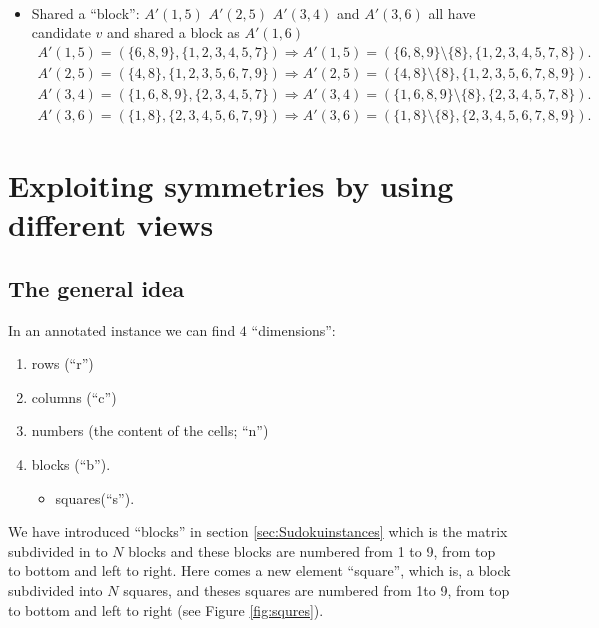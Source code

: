\documentclass[11pt]{report}
\newcommand{\set}[1]{\{ #1 \}}
\begin{document}
\begin{itemize}
\begin{eqnarray*}
\end{eqnarray*}
\item Shared a ``block'': $A'(1,5)$ $A'(2,5)$ $A'(3,4)$ and $A'(3,6)$ all have candidate $v$ and shared a block as $A'(1,6)$
\begin{eqnarray*}
A'(1,5) =(\set{6 ,8, 9}, \set{1, 2, 3, 4, 5, 7})\Rightarrow A'(1,5) =(\set{6 ,8, 9}\setminus \set{8}, \set{1, 2, 3, 4, 5, 7, 8}).\\
A'(2,5) =(\set{4, 8}, \set{1, 2, 3, 5, 6, 7, 9})\Rightarrow A'(2,5) =(\set{4, 8}\setminus \set{8}, \set{1, 2, 3, 5, 6, 7, 8, 9}).\\
A'(3,4) =(\set{1, 6, 8, 9}, \set{2, 3, 4, 5, 7})\Rightarrow A'(3,4) =(\set{1, 6, 8, 9}\setminus \set{8}, \set{2, 3, 4, 5, 7, 8}).\\
A'(3,6) =(\set{1, 8}, \set{2, 3, 4, 5, 6, 7, 9})\Rightarrow A'(3,6) =(\set{1, 8}\setminus \set{8}, \set{2, 3, 4, 5, 6, 7, 8, 9}).
\end{eqnarray*}
\end{itemize}


\chapter{Exploiting symmetries by using different views}
\label{cha:exploitingsymm}


\section{The general idea}
\label{sec:diffviewsidea}

In an annotated instance we can find $4$ ``dimensions'':
\begin{enumerate}
\item rows (``r'')
\item columns (``c'')
\item numbers (the content of the cells; ``n'')
\item blocks (``b'').
\begin{itemize}
\item squares(``s'').
\end{itemize}
\end{enumerate}
We have introduced ``blocks'' in section \ref{sec:Sudokuinstances} which is the matrix subdivided in to $N$ blocks and these blocks are numbered from 1 to 9, from top to bottom and left to right. Here comes a new element ``square'', which is, a block subdivided into $N$ squares, and theses squares are numbered from 1to 9, from top to bottom and left to right (see Figure \ref{fig:squres}). 
\end{document}
